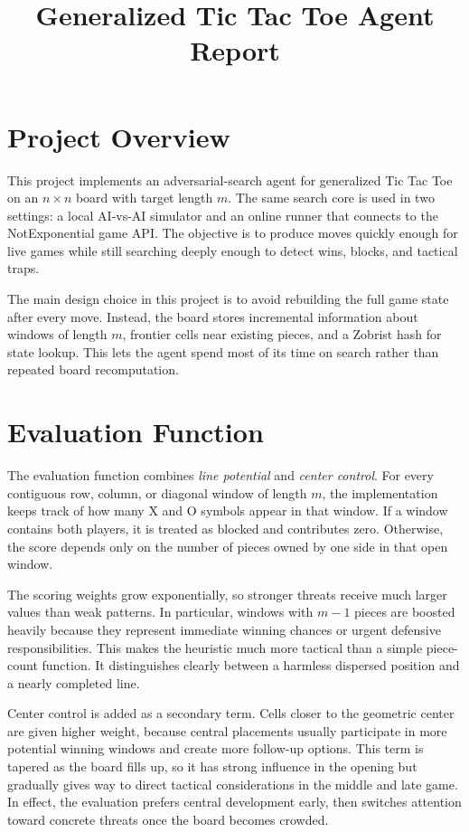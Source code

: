 \documentclass[10pt]{article}
\title{Generalized Tic Tac Toe Agent Report}
\author{}
\date{}
\begin{document}
\maketitle
\thispagestyle{empty}

\section*{Project Overview}
This project implements an adversarial-search agent for generalized Tic Tac Toe on an $n \times n$ board with target length $m$. The same search core is used in two settings: a local AI-vs-AI simulator and an online runner that connects to the NotExponential game API. The objective is to produce moves quickly enough for live games while still searching deeply enough to detect wins, blocks, and tactical traps.

The main design choice in this project is to avoid rebuilding the full game state after every move. Instead, the board stores incremental information about windows of length $m$, frontier cells near existing pieces, and a Zobrist hash for state lookup. This lets the agent spend most of its time on search rather than repeated board recomputation.

\section*{Evaluation Function}
The evaluation function combines \emph{line potential} and \emph{center control}. For every contiguous row, column, or diagonal window of length $m$, the implementation keeps track of how many X and O symbols appear in that window. If a window contains both players, it is treated as blocked and contributes zero. Otherwise, the score depends only on the number of pieces owned by one side in that open window.

The scoring weights grow exponentially, so stronger threats receive much larger values than weak patterns. In particular, windows with $m-1$ pieces are boosted heavily because they represent immediate winning chances or urgent defensive responsibilities. This makes the heuristic much more tactical than a simple piece-count function. It distinguishes clearly between a harmless dispersed position and a nearly completed line.

Center control is added as a secondary term. Cells closer to the geometric center are given higher weight, because central placements usually participate in more potential winning windows and create more follow-up options. This term is tapered as the board fills up, so it has strong influence in the opening but gradually gives way to direct tactical considerations in the middle and late game. In effect, the evaluation prefers central development early, then switches attention toward concrete threats once the board becomes crowded.
\end{document}
